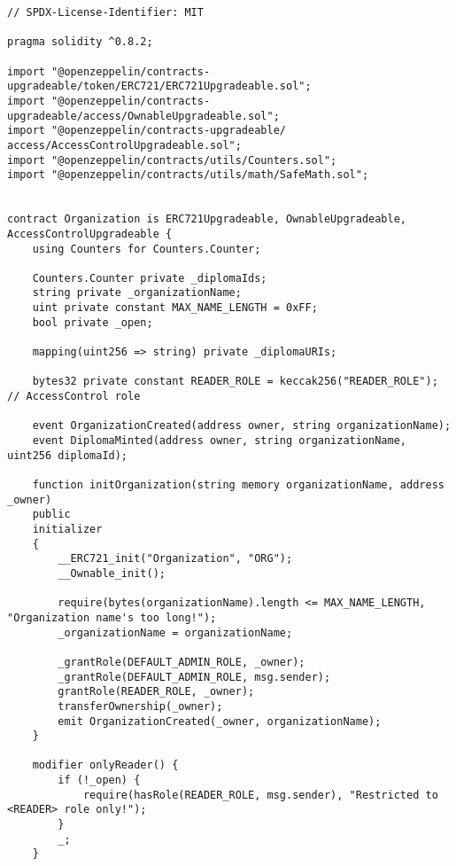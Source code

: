 

\begin{lstlisting}[caption=Код смарт-контракта учебного заведения, label = list3, style=realcode]
// SPDX-License-Identifier: MIT

pragma solidity ^0.8.2;

import "@openzeppelin/contracts-upgradeable/token/ERC721/ERC721Upgradeable.sol";
import "@openzeppelin/contracts-upgradeable/access/OwnableUpgradeable.sol";
import "@openzeppelin/contracts-upgradeable/ access/AccessControlUpgradeable.sol";
import "@openzeppelin/contracts/utils/Counters.sol";
import "@openzeppelin/contracts/utils/math/SafeMath.sol";


contract Organization is ERC721Upgradeable, OwnableUpgradeable, AccessControlUpgradeable {
	using Counters for Counters.Counter;
	
	Counters.Counter private _diplomaIds;
	string private _organizationName;
	uint private constant MAX_NAME_LENGTH = 0xFF;
	bool private _open;
	
	mapping(uint256 => string) private _diplomaURIs;
	
	bytes32 private constant READER_ROLE = keccak256("READER_ROLE");  // AccessControl role
	
	event OrganizationCreated(address owner, string organizationName);
	event DiplomaMinted(address owner, string organizationName, uint256 diplomaId);
	
	function initOrganization(string memory organizationName, address _owner)
	public
	initializer
	{
		__ERC721_init("Organization", "ORG");
		__Ownable_init();
		
		require(bytes(organizationName).length <= MAX_NAME_LENGTH, "Organization name's too long!");
		_organizationName = organizationName;
		
		_grantRole(DEFAULT_ADMIN_ROLE, _owner);
		_grantRole(DEFAULT_ADMIN_ROLE, msg.sender);
		grantRole(READER_ROLE, _owner);
		transferOwnership(_owner);
		emit OrganizationCreated(_owner, organizationName);
	}
	
	modifier onlyReader() {
		if (!_open) {
			require(hasRole(READER_ROLE, msg.sender), "Restricted to <READER> role only!");
		}
		_;
	}
	

\end{lstlisting}
